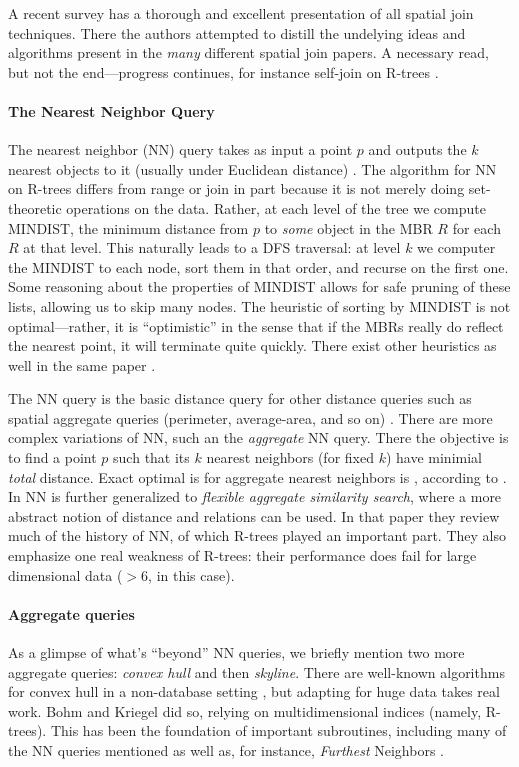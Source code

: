 A recent survey \cite{jacoxsamet07} has a thorough and excellent presentation of all spatial join techniques.
There the authors attempted to distill the undelying ideas and algorithms present in the \emph{many} different spatial join papers.
A necessary read, but not the end---progress continues, for instance self-join on R-trees \cite{vassilakopouloscorralkaranikolas11}.

\paragraph{The Nearest Neighbor Query}
The nearest neighbor (NN) query takes as input a point $p$ and outputs the $k$ nearest objects to it (usually under Euclidean distance) \cite{roussopouloskelleyvincent95}.
The algorithm for NN on R-trees differs from range or join in part because it is not merely doing set-theoretic operations on the data. 
Rather, at each level of the tree we compute MINDIST, the minimum distance from $p$ to \emph{some} object in the MBR $R$ for each $R$ at that level.
This naturally leads to a DFS traversal: at level $k$ we computer the MINDIST to each node, sort them in that order, and recurse on the first one.
Some reasoning about the properties of MINDIST allows for safe pruning of these lists, allowing us to skip many nodes.
The heuristic of sorting by MINDIST is not optimal---rather, it is ``optimistic'' in the sense that if the MBRs really do reflect the nearest point, it will terminate quite quickly.
There exist other heuristics as well in the same paper \cite{roussopouloskelleyvincent95}.

The NN query is the basic distance query for other distance queries such as spatial aggregate queries (perimeter, average-area, and so on) \cite{corralalmendros-jimenez07}.
There are more complex variations of NN, such an the \emph{aggregate} NN query.
There the objective is to find a point $p$ such that its $k$ nearest neighbors (for fixed $k$) have minimial \emph{total} distance.
Exact optimal is for aggregate nearest neighbors is \cite{papadiastaomouratidishui05}, according to \cite{liliyiyaowang11}.
In \cite{liliyiyaowang11} NN is further generalized to \emph{flexible aggregate similarity search}, where a more abstract notion of distance and relations can be used.
In that paper they review much of the history of NN, of which R-trees played an important part.
They also emphasize one real weakness of R-trees: their performance does fail for large dimensional data ($>6$, in this case).

\paragraph{Aggregate queries}
As a glimpse of what's ``beyond'' NN queries, we briefly mention two more aggregate queries: \emph{convex hull} and then \emph{skyline}.
There are well-known algorithms for convex hull in a non-database setting \cite{clrs3rd}, but adapting for huge data takes real work.
Bohm and Kriegel \cite{bohmkriegel01} did so, relying on multidimensional indices (namely, R-trees).
This has been the foundation of important subroutines, including many of the NN queries mentioned as well as, for instance, \emph{Furthest} Neighbors \cite{yaolikumar09}.

